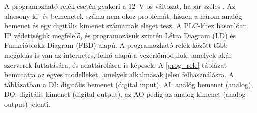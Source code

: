 A programozható relék esetén gyakori a $12$~V-os változat, habár széles . Az alacsony ki- és bemenetek száma nem okoz problémát, hiszen a három analóg bemenet és egy digitális kimenet számainak eleget tesz. A PLC-khez hasonlóan IP védettségük megfelelő, és programozásuk szintén Létra Diagram (LD) és Funkcióblokk Diagram (FBD) alapú. A programozható relék között több megoldás is van az internetes, felhő alapú a vezérlőmodulok, amelyek akár szerverek futtatására, és adattárolásra is képesek. A \ref{prog_rele} táblázat bemutatja az egyes modelleket, amelyek alkalmasak jelen felhasználásra. A táblázatban a DI: digitális bemenet (digital input), AI: analóg bemenet (analog), DO: digitális kimenet (digital output), az AO pedig az analóg kimenet (analog output) jelenti.
\begin{table}[]
	\renewcommand{\arraystretch}{1.4}
\end{table}
